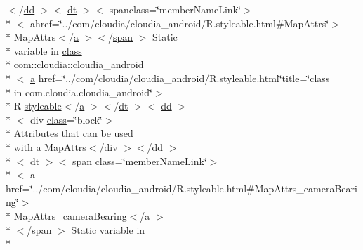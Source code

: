 \begin{DoxyCompactItemize}
\item 
$<$/\hyperlink{stylesheet_8css_a47f4718a86835a7771ec592ece845221}{dd} $>$$<$ \hyperlink{stylesheet_8css_a107565fb4039d33b041380d6e0ea1d80}{dt} $>$$<$ spanclass=\char`\"{}member\-Name\-Link\char`\"{}$>$\\*
$<$ ahref=\char`\"{}../com/cloudia/cloudia\-\_\-android/R.\-styleable.\-html\#Map\-Attrs\char`\"{}$>$\\*
 Map\-Attrs$<$/\hyperlink{style_8css_a5e8981582017bb8b84c21f148345d1f7}{a} $>$$<$/\hyperlink{stylesheet_8css_a8343996ebcf16220b04e54659aac31cc}{span} $>$ Static \\*
variable in \hyperlink{_tools_8html_acf06f836132665ba8114f5a414c2403f}{class} \\*
com\-::cloudia\-::cloudia\-\_\-android\\*
$<$ \hyperlink{style_8css_a5e8981582017bb8b84c21f148345d1f7}{a} href=\char`\"{}../com/cloudia/cloudia\-\_\-android/R.\-styleable.\-html\char`\"{}title=\char`\"{}class \\*
in com.\-cloudia.\-cloudia\-\_\-android\char`\"{}$>$\\*
 R \hyperlink{index-17_8html_ae6c9bf1e41380184b4b665ca9ab6ba0a}{styleable}$<$/\hyperlink{style_8css_a5e8981582017bb8b84c21f148345d1f7}{a} $>$$<$/\hyperlink{stylesheet_8css_a107565fb4039d33b041380d6e0ea1d80}{dt} $>$$<$ \hyperlink{stylesheet_8css_a47f4718a86835a7771ec592ece845221}{dd} $>$\\*
$<$ div \hyperlink{_tools_8html_acf06f836132665ba8114f5a414c2403f}{class}=\char`\"{}block\char`\"{}$>$\\*
 Attributes that can be used \\*
with \hyperlink{style_8css_a5e8981582017bb8b84c21f148345d1f7}{a} Map\-Attrs$<$/div $>$$<$/\hyperlink{stylesheet_8css_a47f4718a86835a7771ec592ece845221}{dd} $>$\\*
$<$ \hyperlink{stylesheet_8css_a107565fb4039d33b041380d6e0ea1d80}{dt} $>$$<$ \hyperlink{stylesheet_8css_a8343996ebcf16220b04e54659aac31cc}{span} \hyperlink{_tools_8html_acf06f836132665ba8114f5a414c2403f}{class}=\char`\"{}member\-Name\-Link\char`\"{}$>$\\*
$<$ a href=\char`\"{}../com/cloudia/cloudia\-\_\-android/R.\-styleable.\-html\#Map\-Attrs\-\_\-camera\-Bearing\char`\"{}$>$\\*
 Map\-Attrs\-\_\-camera\-Bearing$<$/\hyperlink{style_8css_a5e8981582017bb8b84c21f148345d1f7}{a} $>$\\*
$<$/\hyperlink{stylesheet_8css_a8343996ebcf16220b04e54659aac31cc}{span} $>$ Static variable in \\*
$$
\end{DoxyCompactItemize}
